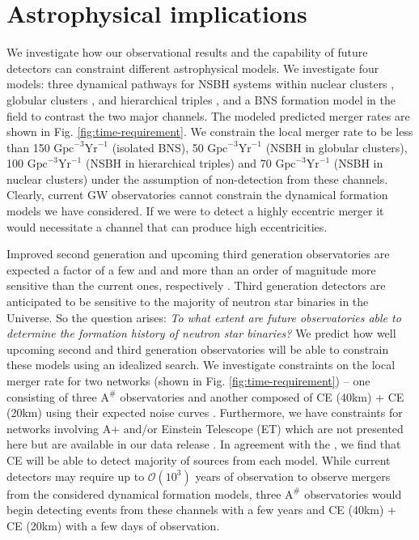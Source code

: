 \documentclass[floatfix,lengthcheck,showpacs,amssymb,amsmath,amsfonts,twocolumn,nofootinbib,longbibliography]{revtex4-1}
\begin{document}
\section{Astrophysical implications} 

We investigate how our observational results and the capability of future detectors can constraint different astrophysical models. We investigate four models: three dynamical pathways for NSBH systems within nuclear clusters \cite{Fragione:2018yrb}, globular clusters \cite{Sedda:2020wzl}, and hierarchical triples \cite{Trani:2021tan}, and a BNS formation model in the field \cite{Belczynski:2017mqx} to contrast the two major channels. The modeled predicted merger rates are shown in Fig. \ref{fig:time-requirement}. We constrain the local merger rate to be less than 150 $\text{Gpc}^{-3}\text{Yr}^{-1}$ (isolated BNS), 50 $\text{Gpc}^{-3}\text{Yr}^{-1}$ (NSBH in globular clusters), 100 $\text{Gpc}^{-3}\text{Yr}^{-1}$ (NSBH in hierarchical triples) and 70 $\text{Gpc}^{-3}\text{Yr}^{-1}$ (NSBH in nuclear clusters) under the assumption of non-detection from these channels. Clearly, current GW observatories cannot constrain the dynamical formation models we have considered. If we were to detect a highly eccentric merger it would necessitate a channel that can produce high eccentricities. 

Improved second generation and upcoming third generation observatories are expected a factor of a few and and more than an order of magnitude more sensitive than the current ones, respectively \cite{Asharp_sensitivity, CE_sensitivity}. Third generation detectors are anticipated to be sensitive to the majority of neutron star binaries in the Universe. So the question arises: \textit{ To what extent are future observatories able to determine the formation history of neutron star binaries?} We predict how well upcoming second and third generation observatories will be able to constrain these models using an idealized search. We investigate constraints on the local merger rate for two networks (shown in Fig. \ref{fig:time-requirement}) -- one consisting of three $\text{A}^{\#}$ observatories and another composed of CE (40km) + CE (20km) using their expected noise curves \cite{Asharp_sensitivity, CE_sensitivity}. Furthermore, we have constraints for networks involving A+ and/or Einstein Telescope (ET) which are not presented here but are available in our data release \cite{github}. In agreement with the \cite{Baibhav:2019gxm}, we find that CE will be able to detect majority of sources from each model. While current detectors may require up to $\mathcal{O}(10^3)$ years of observation to observe mergers from the considered dynamical formation models, three $\text{A}^{\#}$ observatories would begin detecting events from these channels with a few years and CE (40km) + CE (20km) with a few days of observation.  
 
\end{document}
